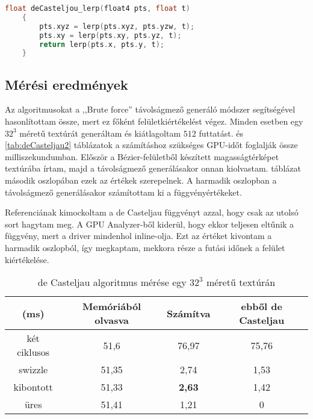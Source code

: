 \lstset{}
\begin{lstlisting}[caption={de Casteljau lerp függvénnyel}, language={C++}, label={lst:lerp}]
	float deCasteljou_lerp(float4 pts, float t)
	{
		pts.xyz = lerp(pts.xyz, pts.yzw, t);
		pts.xy = lerp(pts.xy, pts.yz, t);
		return lerp(pts.x, pts.y, t);
	}
\end{lstlisting}


\subsection{Mérési eredmények}
Az algoritmusokat a ,,Brute force'' távolságmező generáló módszer segítségével hasonlítottam össze, mert ez főként felületkiértékelést végez. Minden esetben egy $32^3$ méretű textúrát generáltam és kiátlagoltam $512$ futtatást.  és \ref{tab:deCasteljau2} táblázatok a számításhoz szükséges GPU-időt foglalják össze milliszekundumban. Először a Bézier-felületből készített magasságtérképet textúrába írtam, majd a távolságmező generálásakor onnan kiolvastam.  táblázat második oszlopában ezek az értékek szerepelnek. A harmadik oszlopban a távolságmező generálásakor számítottam ki a függvényértékeket.

Referenciának kimockoltam a de Casteljau függvényt azzal, hogy csak az utolsó sort hagytam meg. A GPU Analyzer-ből kiderül, hogy ekkor teljesen eltűnik a függvény, mert a driver mindenhol inline-olja. Ezt az értéket kivontam a harmadik oszlopból, így megkaptam, mekkora része a futási időnek a felület kiértékelése.

\begin{table}[H]
	\begin{center}
		\begin{tabular}{| c || c || c | c |}
			\hline
			(ms) & \textbf{Memóriából olvasva} & \textbf{Számítva} & \textbf{ebből de Casteljau} \\ 
			\hline\hline
			két ciklusos & 51,6 & 76,97	& 75,76 \\
			\hline
			swizzle	& 51,35	& 2,74 & 1,53 \\
			\hline
			kibontott & 51,33 & \textbf{2,63} & 1,42 \\
			\hline
			üres & 51,41 & 1,21	& 0 \\
			\hline
		\end{tabular}
	\end{center}
	\caption{de Casteljau algoritmus mérése egy $32^3$ méretű textúrán}
	\label{tab:deCasteljau}
\end{table}

